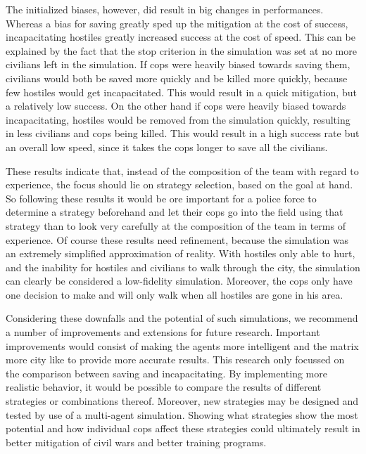 The initialized biases, however, did result in big changes in performances. Whereas a bias for saving greatly sped up the mitigation at the cost of success, incapacitating hostiles greatly increased success at the cost of speed. This can be explained by the fact that the stop criterion in the simulation was set at no more civilians left in the simulation. If cops were heavily biased towards saving them, civilians would both be saved more quickly and be killed more quickly, because few hostiles would get incapacitated. This would result in a quick mitigation, but a relatively low success. On the other hand if cops were heavily biased towards incapacitating, hostiles would be removed from the simulation quickly, resulting in less civilians and cops being killed. This would result in a high success rate but an overall low speed, since it takes the cops longer to save all the civilians.

These results indicate that, instead of the composition of the team with regard to experience, the focus should lie on strategy selection, based on the goal at hand. So following these results it would be ore important for a police force to determine a strategy beforehand and let their cops go into the field using that strategy than to look very carefully at the composition of the team in terms of experience. Of course these results need refinement, because the simulation was an extremely simplified approximation of reality. With hostiles only able to hurt, and the inability for hostiles and civilians to walk through the city, the simulation can clearly be considered a low-fidelity simulation. Moreover, the cops only have one decision to make and will only walk when all hostiles are gone in his area.

Considering these downfalls and the potential of such simulations, we recommend a number of improvements and extensions for future research. Important improvements would consist of making the agents more intelligent and the matrix more city like to provide more accurate results. This research only focussed on the comparison between saving and incapacitating. By implementing more realistic behavior, it would be possible to 
compare the results of different strategies or combinations thereof. Moreover, new strategies may be designed and tested by use of a multi-agent simulation. Showing what strategies show the most 
potential and how individual cops affect these strategies could ultimately result in better mitigation of civil wars and better training programs. 


